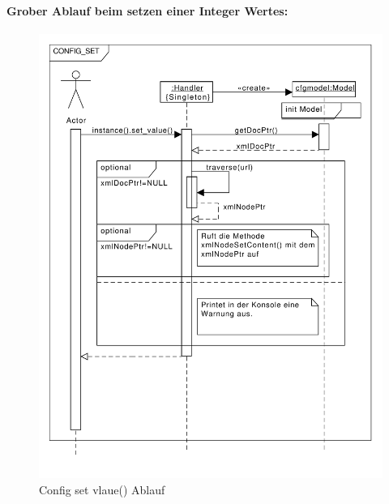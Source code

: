 \paragraph{Grober Ablauf beim setzen einer Integer Wertes:}
\begin{figure}
    \centering
    \includegraphics[scale=0.5]{./gfx/seq/config_set}
    \caption{Config set vlaue() Ablauf}
    \label{c_configget}
\end{figure}
